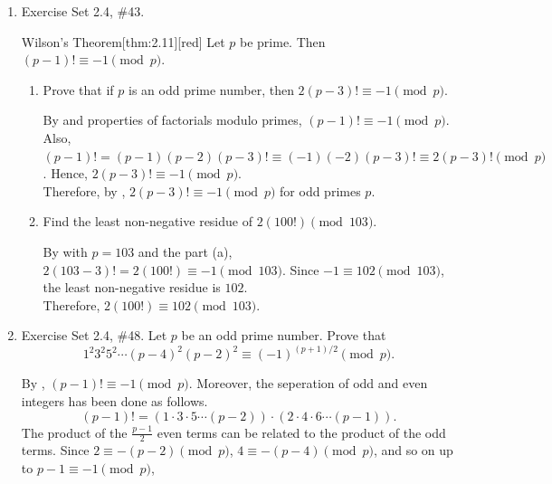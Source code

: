 \begin{enumerate}
\newpage
\item Exercise Set 2.4, \#43.
\begin{define}{Wilson's Theorem}[thm:2.11][red]
  Let $p$ be prime. Then $(p-1)!\equiv -1\pmod{p}$.
\end{define}
\begin{enumerate}
  \item Prove that if $p$ is an odd prime number, then $2(p-3)! \equiv -1 \pmod{p}$.
  \begin{subprove}
    By  and properties of factorials modulo primes, 
    $(p-1)!\equiv -1\pmod{p}$. Also, 
    $(p-1)!=(p-1)(p-2)(p-3)!\equiv (-1)(-2)(p-3)!\equiv 2(p-3)!\pmod{p}$. 
    Hence, $2(p-3)!\equiv -1\pmod{p}$.\vspace*{10px}\\
    Therefore, by , $2(p-3)!\equiv -1\pmod{p}$ for odd primes $p$.
  \end{subprove}
  \item Find the least non-negative residue of $2(100!) \pmod{103}$.
  \begin{subanswer}
    By  with $p=103$ and the part (a), $2(103-3)!=2(100!)\equiv -1\pmod{103}$. 
    Since $-1\equiv 102\pmod{103}$, the least non-negative residue is $102$.\vspace*{10px}\\
    Therefore, $2(100!)\equiv 102\pmod{103}$.
  \end{subanswer}
\end{enumerate}
\item Exercise Set 2.4, \#48.
Let $p$ be an odd prime number. Prove that 
\begin{equation*}
1^2 3^2 5^2 \cdots (p-4)^2 (p-2)^2 \equiv (-1)^{(p+1)/2} \pmod{p}.
\end{equation*}
\begin{subprove}
  By , $(p-1)!\equiv -1\pmod{p}$. Moreover, the seperation of odd and even integers has been done as follows.
  \[
  (p-1)! = (1 \cdot 3 \cdot 5 \cdots (p-2)) \cdot (2 \cdot 4 \cdot 6 \cdots (p-1)).
  \]
  The product of the $\frac{p-1}{2}$ even terms can be related to the product of the odd terms. Since 
  $2 \equiv -(p-2) \pmod{p}$, $4 \equiv -(p-4) \pmod{p}$, and so on up to $p-1 \equiv -1 \pmod{p}$,

\end{subprove}
\end{enumerate}
